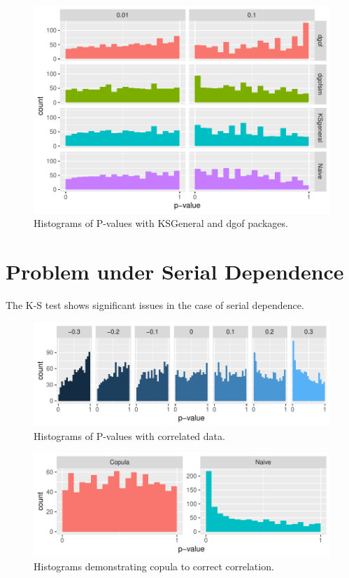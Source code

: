 \documentclass[12pt, letterpaper, titlepage]{article}
\begin{document}
\begin{figure}[tbp]
  \centering
  \includegraphics{hist_general}
  \caption{Histograms of P-values with KSGeneral and dgof packages.}
  \label{fig:hist_general}
\end{figure}

\hypertarget{sec:correlation}{%
\section{Problem under Serial Dependence}\label{sec:correlation}}

The K-S test shows significant issues in the case of serial dependence.

\begin{figure}[tbp]
  \centering
  \includegraphics{hist_correlation}
  \caption{Histograms of P-values with correlated data.}
  \label{fig:hist_correlation}
\end{figure}

\begin{figure}[tbp]
  \centering
  \includegraphics{hist_copula}
  \caption{Histograms demonstrating copula to correct correlation.}
  \label{fig:hist_copula}
\end{figure}
\end{document}
